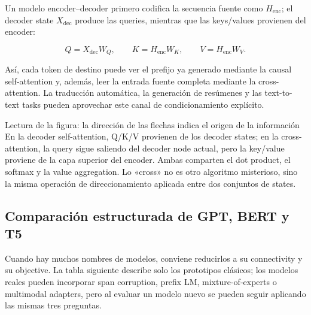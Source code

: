 Un modelo encoder--decoder primero codifica la secuencia fuente como $H_{\text{enc}}$; el decoder state $X_{\text{dec}}$ produce las queries, mientras que las keys/values provienen del encoder:

\[
Q=X_{\text{dec}}W_Q,\qquad
K=H_{\text{enc}}W_K,\qquad
V=H_{\text{enc}}W_V.
\]

Así, cada token de destino puede ver el prefijo ya generado mediante la causal self-attention y, además, leer la entrada fuente completa mediante la cross-attention. La traducción automática, la generación de resúmenes y las text-to-text tasks pueden aprovechar este canal de condicionamiento explícito.


\begin{knowledgebox}{Lectura de la figura: la dirección de las flechas indica el origen de la información}
En la decoder self-attention, Q/K/V provienen de los decoder states; en la cross-attention, la query sigue saliendo del decoder node actual, pero la key/value proviene de la capa superior del encoder. Ambas comparten el dot product, el softmax y la value aggregation. Lo «cross» no es otro algoritmo misterioso, sino la misma operación de direccionamiento aplicada entre dos conjuntos de states.
\end{knowledgebox}

\subsection{Comparación estructurada de GPT, BERT y T5}

Cuando hay muchos nombres de modelos, conviene reducirlos a su connectivity y su objective. La tabla siguiente describe solo los prototipos clásicos; los modelos reales pueden incorporar span corruption, prefix LM, mixture-of-experts o multimodal adapters, pero al evaluar un modelo nuevo se pueden seguir aplicando las mismas tres preguntas.


